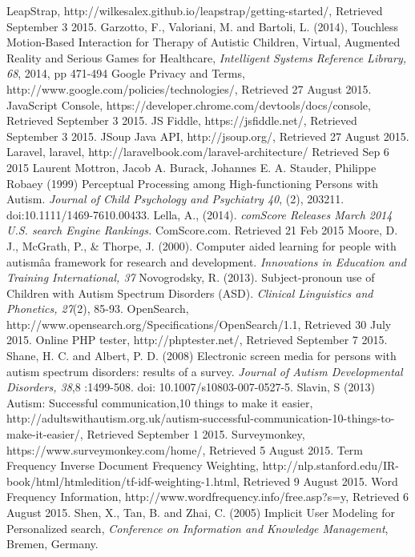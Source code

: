 \documentclass[a4paper, 11pt]{article}
\begin{document}
\begin{thebibliography}{100}
 LeapStrap, http://wilkesalex.github.io/leapstrap/getting-started/, Retrieved September 3 2015.
 Garzotto, F., Valoriani, M. and Bartoli, L. (2014), Touchless Motion-Based Interaction for Therapy of Autistic Children, Virtual, Augmented Reality and Serious Games for Healthcare, \textit{Intelligent Systems Reference Library, 68}, 2014, pp 471-494
 Google Privacy and Terms, http://www.google.com/policies/technologies/, Retrieved 27 August 2015.
 JavaScript Console, https://developer.chrome.com/devtools/docs/console, Retrieved September 3 2015.
 JS Fiddle, https://jsfiddle.net/, Retrieved September 3 2015.
 JSoup Java API, http://jsoup.org/, Retrieved 27 August 2015.
Laravel, laravel, http://laravelbook.com/laravel-architecture/ Retrieved Sep 6 2015
Laurent Mottron, Jacob A. Burack, Johannes E. A. Stauder, Philippe Robaey (1999) Perceptual Processing among High-functioning Persons with Autism. \textit{Journal of Child Psychology and Psychiatry 40}, (2), 203211. doi:10.1111/1469-7610.00433.
Lella, A., (2014). \textit{comScore Releases March 2014 U.S. search Engine Rankings.} ComScore.com. Retrieved 21 Feb 2015
Moore, D. J., McGrath, P., \& Thorpe, J. (2000). Computer aided learning for people with autismâa framework for research and development. \textit{Innovations in Education and Training International, 37}
 Novogrodsky, R. (2013). Subject-pronoun use of Children with Autism Spectrum Disorders (ASD). \textit{Clinical Linguistics and Phonetics, 27}(2), 85-93. 
OpenSearch, http://www.opensearch.org/Specifications/OpenSearch/1.1, Retrieved 30 July 2015.
 Online PHP tester, http://phptester.net/, Retrieved September 7 2015.
Shane, H. C. and Albert, P. D. (2008) Electronic screen media for persons with autism spectrum disorders: results of a survey. \textit{Journal of Autism Developmental Disorders, 38},8 :1499-508. doi: 10.1007/s10803-007-0527-5.
 Slavin, S (2013) Autism: Successful communication,10 things to make it easier, http://adultswithautism.org.uk/autism-successful-communication-10-things-to-make-it-easier/, Retrieved September 1 2015.
Surveymonkey, https://www.surveymonkey.com/home/, Retrieved 5 August 2015.
 Term Frequency Inverse Document Frequency Weighting, http://nlp.stanford.edu/IR-book/html/htmledition/tf-idf-weighting-1.html, Retrieved 9 August 2015.
 Word Frequency Information, http://www.wordfrequency.info/free.asp?s=y, Retrieved 6 August 2015.
Shen, X., Tan, B. and Zhai, C. (2005) Implicit User Modeling for Personalized search, \textit{Conference on Information and Knowledge Management}, Bremen, Germany.
\end{thebibliography}
\end{document}

